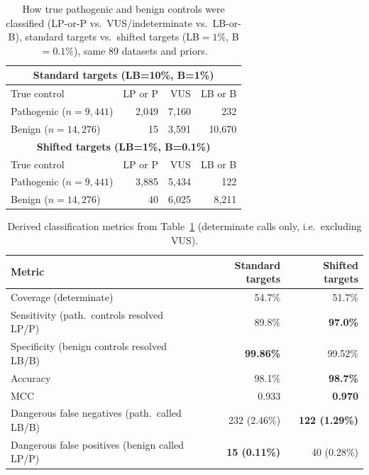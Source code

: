 \documentclass[11pt]{article}
\begin{document}
\begin{table}[h]
\centering
\caption{How true pathogenic and benign controls were classified (LP-or-P
         vs.\ VUS/indeterminate vs.\ LB-or-B), standard targets vs.\ shifted
         targets (LB$=1\%$, B$=0.1\%$), same 89 datasets and priors.}
\label{tab:target_confusion}
\begin{tabular}{lrrr}
\toprule
\multicolumn{4}{c}{\textbf{Standard targets (LB=10\%, B=1\%)}} \\
\midrule
True control & LP or P & VUS & LB or B \\
\midrule
Pathogenic ($n=9{,}441$) & 2{,}049 & 7{,}160 & 232 \\
Benign ($n=14{,}276$)    & 15      & 3{,}591 & 10{,}670 \\
\midrule
\multicolumn{4}{c}{\textbf{Shifted targets (LB=1\%, B=0.1\%)}} \\
\midrule
True control & LP or P & VUS & LB or B \\
\midrule
Pathogenic ($n=9{,}441$) & 3{,}885 & 5{,}434 & 122 \\
Benign ($n=14{,}276$)    & 40      & 6{,}025 & 8{,}211 \\
\bottomrule
\end{tabular}
\end{table}

\begin{table}[h]
\centering
\caption{Derived classification metrics from Table~\ref{tab:target_confusion}
         (determinate calls only, i.e.\ excluding VUS).}
\label{tab:target_metrics}
\begin{tabular}{lrr}
\toprule
Metric & Standard targets & Shifted targets \\
\midrule
Coverage (determinate)                          & 54.7\% & 51.7\% \\
Sensitivity (path.\ controls resolved LP/P)      & 89.8\% & \textbf{97.0\%} \\
Specificity (benign controls resolved LB/B)      & \textbf{99.86\%} & 99.52\% \\
Accuracy                                         & 98.1\% & \textbf{98.7\%} \\
MCC                                              & 0.933 & \textbf{0.970} \\
Dangerous false negatives (path.\ called LB/B)   & 232 (2.46\%) & \textbf{122 (1.29\%)} \\
Dangerous false positives (benign called LP/P)   & \textbf{15 (0.11\%)} & 40 (0.28\%) \\
\bottomrule
\end{tabular}
\end{table}
\end{document}
